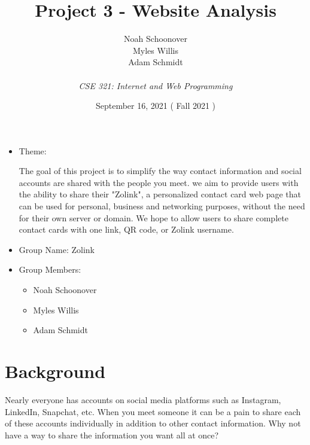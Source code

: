\documentclass[12pt]{article}%
\def\assignmentName { Project 3 - Website Analysis                      }
\def\className      { CSE 321: Internet and Web Programming             }
\def\studentName    { Noah Schoonover \\ Myles Willis \\ Adam Schmidt   }
\def\studentEmail   {  }
\def\dueDate        { September 16, 2021                                }
\def\semesterDate   { Fall 2021                                         }
\begin{document}


\begin{singlespace}
\title{ \assignmentName }
\author{ \studentName \\ {\small \studentEmail} \\ {\it \className}}
\date{\dueDate (\semesterDate)}
\maketitle
\end{singlespace}



\begin{itemize}
    \item Theme:

    The goal of this project is to simplify the way contact information and social accounts are shared with the people you meet.
    we aim to provide users with the ability to share their "Zolink", a personalized contact card web page that can be used for personal,
    business and networking purposes, without the need for their own server or domain. We hope to allow users to share complete
    contact cards with one link, QR code, or Zolink username.

    \item Group Name: Zolink
    \item Group Members:
    \begin{itemize}
        \item Noah Schoonover
        \item Myles Willis
        \item Adam Schmidt
    \end{itemize}
\end{itemize}


\section{Background}

Nearly everyone has accounts on social media platforms such as Instagram, LinkedIn, Snapchat, etc. When you meet someone it can
be a pain to share each of these accounts individually in addition to other contact information. Why not have a way to share the
information you want all at once?
\end{document}

